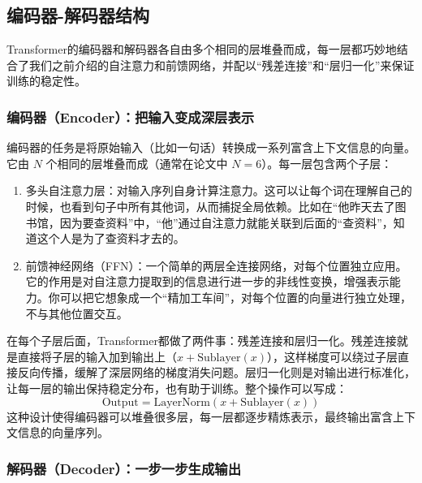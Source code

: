 \documentclass[lang=cn,zihao=-4,a4paper,fontset=windows]{beautybook}
\begin{document}
\subsection{编码器-解码器结构}

Transformer的编码器和解码器各自由多个相同的层堆叠而成，每一层都巧妙地结合了我们之前介绍的自注意力和前馈网络，并配以“残差连接”和“层归一化”来保证训练的稳定性。

\subsubsection{编码器（Encoder）：把输入变成深层表示}

编码器的任务是将原始输入（比如一句话）转换成一系列富含上下文信息的向量。它由 \(N\) 个相同的层堆叠而成（通常在论文中 \(N=6\)）。每一层包含两个子层：
\begin{enumerate}
    \item 多头自注意力层：对输入序列自身计算注意力。这可以让每个词在理解自己的时候，也看到句子中所有其他词，从而捕捉全局依赖。比如在“他昨天去了图书馆，因为要查资料”中，“他”通过自注意力就能关联到后面的“查资料”，知道这个人是为了查资料才去的。
    \item 前馈神经网络（FFN）：一个简单的两层全连接网络，对每个位置独立应用。它的作用是对自注意力提取到的信息进行进一步的非线性变换，增强表示能力。你可以把它想象成一个“精加工车间”，对每个位置的向量进行独立处理，不与其他位置交互。
\end{enumerate}
在每个子层后面，Transformer都做了两件事：残差连接和层归一化。残差连接就是直接将子层的输入加到输出上（\(x + \text{Sublayer}(x)\)），这样梯度可以绕过子层直接反向传播，缓解了深层网络的梯度消失问题。层归一化则是对输出进行标准化，让每一层的输出保持稳定分布，也有助于训练。整个操作可以写成：
\[
\text{Output} = \text{LayerNorm}(x + \text{Sublayer}(x))
\]
这种设计使得编码器可以堆叠很多层，每一层都逐步精炼表示，最终输出富含上下文信息的向量序列。

\subsubsection{解码器（Decoder）：一步一步生成输出}
\end{document}
